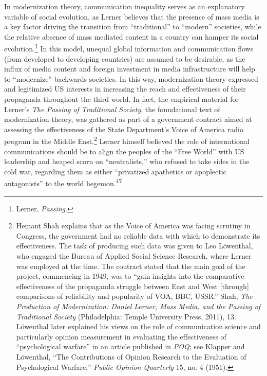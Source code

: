 \documentclass{tufte-handout}
\begin{document}
In modernization theory, communication inequality serves as an
explanatory variable of social evolution, as Lerner believes that the
presence of mass media is a key factor driving the transition from
``traditional'' to ``modern'' societies, while the relative absence of
mass mediated content in a country can hamper its social
evolution.\footnote{Lerner, \emph{Passing}.} In this model, unequal
global information and communication flows (from developed to developing
countries) are assumed to be desirable, as the influx of media content
and foreign investment in media infrastructure will help to
``modernize'' backwards societies. In this way, modernization theory
expressed and legitimized US interests in increasing the reach and
effectiveness of their propaganda throughout the third world. In fact,
the empirical material for Lerner's \emph{The Passing of Traditional
Society}, the foundational text of modernization theory, was gathered as
part of a government contract aimed at assessing the effectiveness of
the State Department's Voice of America radio program in the Middle
East.\footnote{Hemant Shah explains that as the Voice of America was
  facing scrutiny in Congress, the government had no reliable data with
  which to demonstrate its effectiveness. The task of producing such
  data was given to Leo Löwenthal, who engaged the Bureau of Applied
  Social Science Research, where Lerner was employed at the time. The
  contract stated that the main goal of the project, commencing in 1949,
  was to ``gain insights into the comparative effectiveness of the
  propaganda struggle between East and West {[}through{]} comparisons of
  reliability and popularity of VOA, BBC, USSR.'' Shah, \emph{The
  Production of Modernization: Daniel Lerner, Mass Media, and the
  Passing of Traditional Society} (Philadelphia: Temple University
  Press, 2011), 13. Löwenthal later explained his views on the role of
  communication science and particularly opinion measurement in
  evaluating the effectiveness of ``psychological warfare'' in an
  article published in \emph{POQ}; see Klapper and Löwenthal, ``The
  Contributions of Opinion Research to the Evaluation of Psychological
  Warfare,'' \emph{Public Opinion Quarterly} 15, no. 4 (1951).} Lerner
himself believed the role of international communications should be to
align the peoples of the ``Free World'' with US leadership and heaped
scorn on ``neutralists,'' who refused to take sides in the cold war,
regarding them as either ``privatized apathetics or apoplectic
antagonists'' to the world hegemon.\textsuperscript{47}
\end{document}
